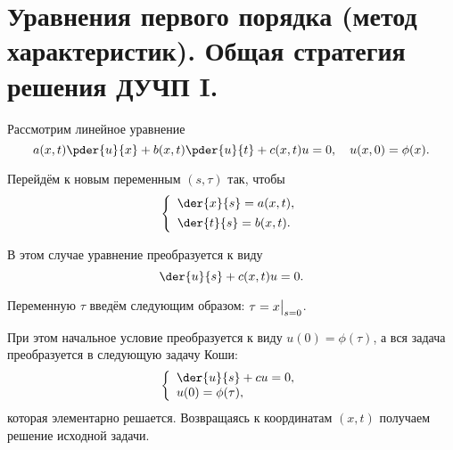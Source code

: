 \chapter{Уравнения первого порядка (метод характеристик). Общая стратегия
решения ДУЧП I.}

Рассмотрим линейное уравнение
\[
    a(x, t)\pder{u}{x} + b(x, t)\pder{u}{t} + c(x, t)u = 0, \quad
    u(x, 0) = \phi(x).
\]

Перейдём к новым переменным \( (s, \tau) \) так, чтобы
\[
    \left\{ \begin{array}{l}
        \ds \der{x}{s} = a(x, t), \\[.4em]
        \ds \der{t}{s} = b(x, t).
    \end{array} \right.
\]

В этом случае уравнение преобразуется к виду
\[
    \der{u}{s} + c(x, t)u = 0.
\]

Переменную \( \tau \) введём следующим образом: \( \displaystyle \tau = x\bigr|_{s=0} \).

При этом начальное условие преобразуется к виду \( u(0) = \phi(\tau) \), а вся
задача преобразуется в следующую задачу Коши:
\[
    \left\{ \begin{array}{l}
        \ds \der{u}{s} + cu = 0, \\
        u(0) = \phi(\tau),
    \end{array} \right.
\]
которая элементарно решается. Возвращаясь к координатам \( (x, t) \) получаем
решение исходной задачи.
\newpage

